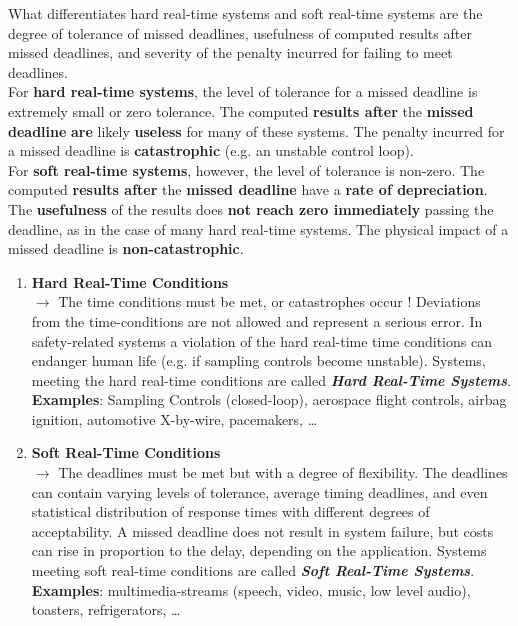 What differentiates hard real-time systems and soft real-time systems are the degree of tolerance of missed deadlines, usefulness of computed results after missed deadlines, and severity of the penalty incurred for failing to meet deadlines.\\

For \textbf{hard real-time systems}, the level of tolerance for a missed deadline is extremely small or zero tolerance. The computed \textbf{results after} the \textbf{missed} \textbf{deadline} \textbf{are} likely \textbf{useless} for many of these systems. The penalty incurred for a missed deadline is \textbf{catastrophic} (e.g. an unstable control loop). \\

For \textbf{soft real-time systems}, however, the level of tolerance is non-zero. The computed \textbf{results after} the \textbf{missed deadline} have a \textbf{rate of depreciation}. The \textbf{usefulness} of the results does \textbf{not reach zero immediately} passing the deadline, as in the case of many hard real-time systems. The physical impact of a missed deadline is\textbf{ non-catastrophic}.

\begin{enumerate}
	\item  \textbf{Hard Real-Time Conditions} \\
	$\rightarrow$ The time conditions must be met, or catastrophes occur !  Deviations from the time-conditions are not allowed and represent a serious error. In safety-related systems a violation of the hard real-time time conditions can endanger human life (e.g. if sampling controls become unstable). Systems, meeting the hard real-time conditions are called \textbf{\textit{Hard Real-Time Systems}}.\\
	
\textbf{Examples}: Sampling Controls (closed-loop), aerospace flight controls, airbag ignition, automotive X-by-wire, pacemakers, {\dots} 
	\item  \textbf{Soft Real-Time Conditions} \\
	$\rightarrow$ The deadlines must be met but with a degree of flexibility. The deadlines can contain varying levels of tolerance, average timing deadlines, and even statistical distribution of response times with different degrees of acceptability. A missed deadline does not result in system failure, but costs can rise in proportion to the delay, depending on the application. Systems meeting soft real-time conditions are called \textbf{\textit{Soft Real-Time Systems}}.\\
	
\textbf{Examples}: multimedia-streams (speech, video, music, low level audio), toasters, refrigerators, {\dots} 
\end{enumerate}

